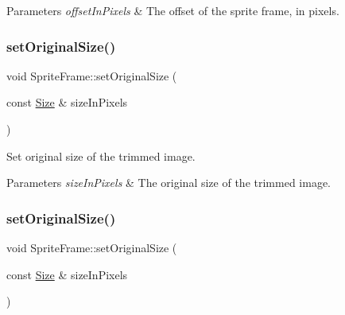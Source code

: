 \begin{DoxyParams}{Parameters}
{\em offset\+In\+Pixels} & The offset of the sprite frame, in pixels. \\
\hline
\end{DoxyParams}
\mbox{\label{classSpriteFrame_a59473dbd75737dee69855a0c7acf913f}} 
\subsubsection{\texorpdfstring{set\+Original\+Size()}{setOriginalSize()}\hspace{0.1cm}{\footnotesize\ttfamily [1/2]}}
{\footnotesize\ttfamily void Sprite\+Frame\+::set\+Original\+Size (\begin{DoxyParamCaption}\item[{const \hyperlink{classSize}{Size} \&}]{size\+In\+Pixels }\end{DoxyParamCaption})\hspace{0.3cm}{\ttfamily [inline]}}

Set original size of the trimmed image.


\begin{DoxyParams}{Parameters}
{\em size\+In\+Pixels} & The original size of the trimmed image. \\
\hline
\end{DoxyParams}
\mbox{\label{classSpriteFrame_a59473dbd75737dee69855a0c7acf913f}} 
\subsubsection{\texorpdfstring{set\+Original\+Size()}{setOriginalSize()}\hspace{0.1cm}{\footnotesize\ttfamily [2/2]}}
{\footnotesize\ttfamily void Sprite\+Frame\+::set\+Original\+Size (\begin{DoxyParamCaption}\item[{const \hyperlink{classSize}{Size} \&}]{size\+In\+Pixels }\end{DoxyParamCaption})\hspace{0.3cm}{\ttfamily [inline]}}

